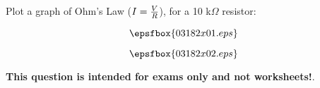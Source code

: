 

Plot a graph of Ohm's Law ($I = {V \over R}$), for a 10 k$\Omega$ resistor:

$$\epsfbox{03182x01.eps}$$







$$\epsfbox{03182x02.eps}$$







{\bf This question is intended for exams only and not worksheets!}.




